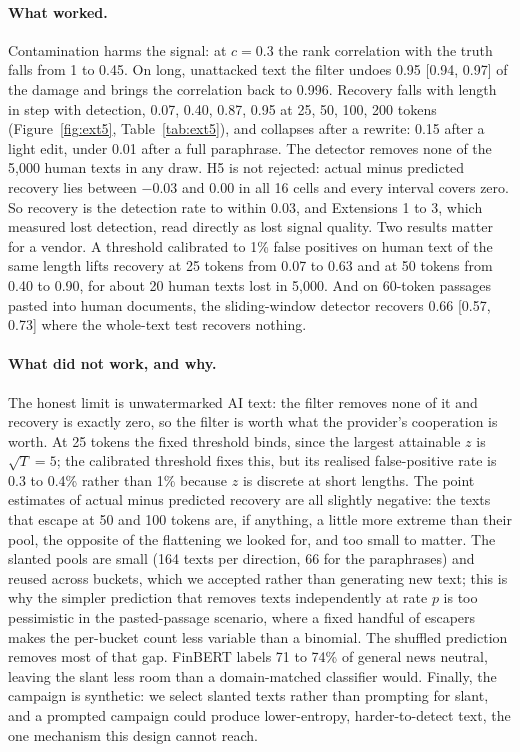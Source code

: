 \documentclass[12pt,letterpaper]{article}
\begin{document}
\paragraph{What worked.} Contamination harms the signal: at $c = 0.3$ the rank correlation with the truth falls from 1 to 0.45. On long, unattacked text the filter undoes 0.95 [0.94, 0.97] of the damage and brings the correlation back to 0.996. Recovery falls with length in step with detection, 0.07, 0.40, 0.87, 0.95 at 25, 50, 100, 200 tokens (Figure~\ref{fig:ext5}, Table~\ref{tab:ext5}), and collapses after a rewrite: 0.15 after a light edit, under 0.01 after a full paraphrase. The detector removes none of the 5,000 human texts in any draw. H5 is not rejected: actual minus predicted recovery lies between $-0.03$ and $0.00$ in all 16 cells and every interval covers zero. So recovery is the detection rate to within 0.03, and Extensions 1 to 3, which measured lost detection, read directly as lost signal quality. Two results matter for a vendor. A threshold calibrated to 1\% false positives on human text of the same length lifts recovery at 25 tokens from 0.07 to 0.63 and at 50 tokens from 0.40 to 0.90, for about 20 human texts lost in 5,000. And on 60-token passages pasted into human documents, the sliding-window detector recovers 0.66 [0.57, 0.73] where the whole-text test recovers nothing.

\paragraph{What did not work, and why.} The honest limit is unwatermarked AI text: the filter removes none of it and recovery is exactly zero, so the filter is worth what the provider's cooperation is worth. At 25 tokens the fixed threshold binds, since the largest attainable $z$ is $\sqrt{T} = 5$; the calibrated threshold fixes this, but its realised false-positive rate is 0.3 to 0.4\% rather than 1\% because $z$ is discrete at short lengths. The point estimates of actual minus predicted recovery are all slightly negative: the texts that escape at 50 and 100 tokens are, if anything, a little more extreme than their pool, the opposite of the flattening we looked for, and too small to matter. The slanted pools are small (164 texts per direction, 66 for the paraphrases) and reused across buckets, which we accepted rather than generating new text; this is why the simpler prediction that removes texts independently at rate $p$ is too pessimistic in the pasted-passage scenario, where a fixed handful of escapers makes the per-bucket count less variable than a binomial. The shuffled prediction removes most of that gap. FinBERT labels 71 to 74\% of general news neutral, leaving the slant less room than a domain-matched classifier would. Finally, the campaign is synthetic: we select slanted texts rather than prompting for slant, and a prompted campaign could produce lower-entropy, harder-to-detect text, the one mechanism this design cannot reach.
\end{document}
